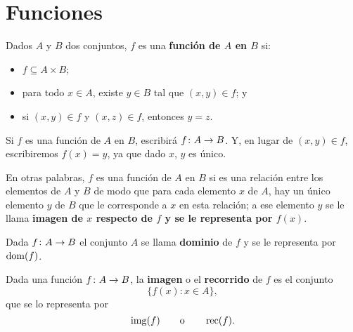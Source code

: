 \documentclass[a4,11pt]{aleph-notas}
\begin{document}
\encabezado

\section{Funciones}

\begin{defi}[Función]
    Dados $A$ y $B$ dos conjuntos, $f$ es una \textbf{función de $A$ en $B$} si:
    \begin{itemize}
    \item 
        $f\subseteq A\times B$;
    \item 
        para todo $x\in A$, existe $y\in B$ tal que $(x,y)\in f$; y
    \item 
        si $(x,y)\in f$ y $(x,z)\in f$, entonces $y=z$.
    \end{itemize}
    Si $f$ es una función de $A$ en $B$, escribirá $f\colon A \rightarrow B$. Y, en lugar de $(x,y)\in f$, escribiremos $f(x)=y$, ya que dado $x$, $y$ es único.
\end{defi}

En otras palabras, $f$ es una función de $A$ en $B$ si es una relación entre los elementos de $A$ y $B$ de modo que para cada elemento $x$ de $A$, hay un único elemento $y$ de $B$ que le corresponde a $x$ en esta relación; a ese elemento $y$ se le llama \textbf{imagen de $x$ respecto de $f$ y se le representa por $f(x)$}.

\begin{defi}[Dominio]
    Dada $f\colon A \rightarrow B$ el conjunto $A$ se llama \textbf{dominio} de $f$ y se le representa por $\operatorname{dom}(f)$.
\end{defi}

\begin{defi}
    Dada una función $f\colon A \rightarrow B$, la \textbf{imagen} o el \textbf{recorrido} de $f$ es el conjunto
    \[
        \{f(x) : x\in A\},
    \]
    que se lo representa por 
    \[
        \operatorname{img}(f)
        \qquad\text{o}\qquad
        \operatorname{rec}(f).
    \]
\end{defi}
\end{document}
